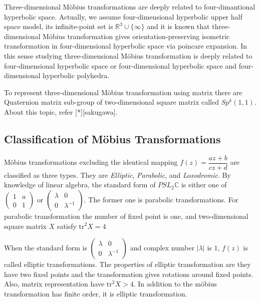 Three-dimensional M\"obius transformations are deeply related to
four-dimantional hyperbolic space. Actually, we assume four-dimensional
hyperbolic upper half space model, its infinite-point set is
$\mathbb{R}^3\cup\{\infty\}$ and it is known that three-dimensional M\"obius
transformation gives orientation-preserving isometric transformation in
four-dimensional hyperbolic space via poincare expansion.
In this sense studying three-dimensional M\"obius transformation is
deeply related to four-dimensional hyperbolic space or four-dimensional
hyperbolic space and four-dimensional hyperbolic polyhedra.

To represent three-dimensional M\"obius transformation using matrix
there are Quaternion matrix sub-group of two-dimensional square matrix called
$Sp^k(1,1)$. About this topic, refer [*][sakugawa].

\subsection{Classification of M\"obius Transformations}

M\"obius transformations excluding the identical mapping
$f(z) = \dfrac{az + b}{cz + d}$ are classified as three types.
They are \textit{Elliptic}, \textit{Parabolic}, and \textit{Loxodromic}.
By knowledge of linear algebra, the standard form of $PSL_2\mathbb{C}$
is either one of $\begin{pmatrix}1 & a \\ 0 & 1 \end{pmatrix}$ or
$\begin{pmatrix}\lambda & 0 \\ 0 & \lambda^{-1} \end{pmatrix}$.
The former one is parabolic transformations.
For parabolic transformation the number of fixed point is one, and
two-dimensional square matrix $X$ satisfy $\mathrm{tr}^2X = 4$

When the standard form is
$\begin{pmatrix}\lambda & 0 \\ 0 & \lambda^{-1} \end{pmatrix}$
and complex number $|\lambda|$ is $1$, $f(z)$ is called elliptic
transformations. The properties of elliptic transformation are they have
two fixed points and the transformation gives rotations around fixed
points.
Also, matrix representation have $\mathrm{tr}^2X > 4$.
In addition to the m\"obius transformation has finite order,
it is elliptic transformation.


